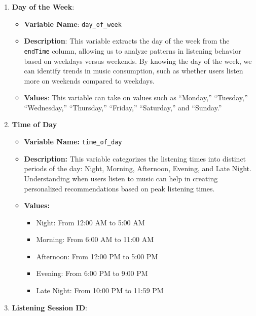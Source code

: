 \documentclass[
]{article}
\providecommand{\tightlist}{%
  \setlength{\itemsep}{0pt}\setlength{\parskip}{0pt}}
\begin{document}
\begin{enumerate}
\def\labelenumi{\arabic{enumi}.}
\tightlist
\item
  \textbf{Day of the Week}:

  \begin{itemize}
  \tightlist
  \item
    \textbf{Variable Name}: \texttt{day\_of\_week}
  \item
    \textbf{Description}: This variable extracts the day of the week
    from the \texttt{endTime} column, allowing us to analyze patterns in
    listening behavior based on weekdays versus weekends. By knowing the
    day of the week, we can identify trends in music consumption, such
    as whether users listen more on weekends compared to weekdays.
  \item
    \textbf{Values}: This variable can take on values such as
    ``Monday,'' ``Tuesday,'' ``Wednesday,'' ``Thursday,'' ``Friday,''
    ``Saturday,'' and ``Sunday.''
  \end{itemize}
\item
  \textbf{Time of Day}

  \begin{itemize}
  \tightlist
  \item
    \textbf{Variable Name:} \texttt{time\_of\_day}
  \item
    \textbf{Description:} This variable categorizes the listening times
    into distinct periods of the day: Night, Morning, Afternoon,
    Evening, and Late Night. Understanding when users listen to music
    can help in creating personalized recommendations based on peak
    listening times.
  \item
    \textbf{Values:}

    \begin{itemize}
    \tightlist
    \item
      Night: From 12:00 AM to 5:00 AM
    \item
      Morning: From 6:00 AM to 11:00 AM
    \item
      Afternoon: From 12:00 PM to 5:00 PM
    \item
      Evening: From 6:00 PM to 9:00 PM
    \item
      Late Night: From 10:00 PM to 11:59 PM
    \end{itemize}
  \end{itemize}
\item
  \textbf{Listening Session ID}:


\end{enumerate}
\end{document}
